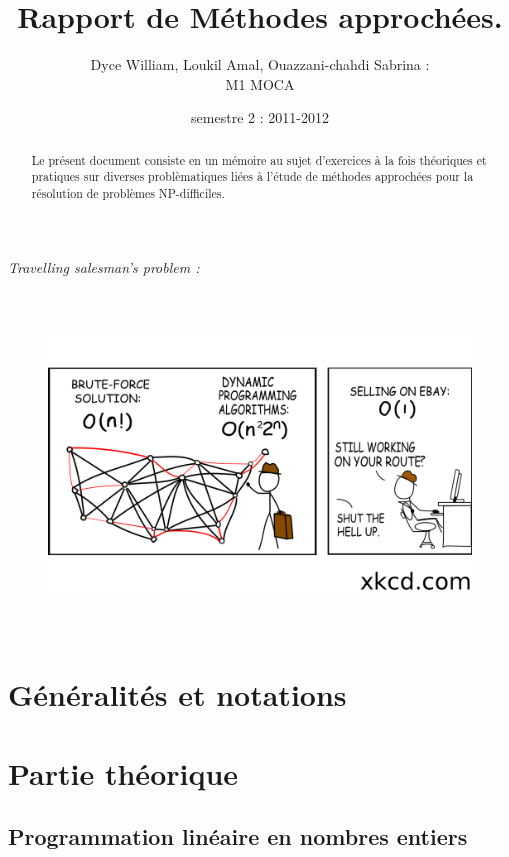 \documentclass[a4paper, 12pt]{article}
\title{Rapport de Méthodes approchées.}
\author{Dyce William, Loukil Amal, Ouazzani-chahdi Sabrina : \\ M1 MOCA}
\date{semestre 2 : 2011-2012}
\begin{document}
 

\maketitle

\begin{abstract}
  Le présent document consiste en un mémoire au sujet
  d'exercices à la fois théoriques et pratiques sur diverses
  problèmatiques liées à l'étude de méthodes approchées pour la
  résolution de problèmes NP-difficiles. 
\end{abstract}
\vspace{2cm}
\textit{Travelling salesman's problem :}
\begin{figure}[h!]
\centering
\includegraphics[height = 9cm]{commerce.png}
\end{figure}


\pagebreak

\tableofcontents

\pagebreak

\listoffigures

\listoftables
\pagebreak

\section{Généralités et notations}

\pagebreak

\section{Partie théorique}

\subsection{Programmation linéaire en nombres entiers}
\end{document}
